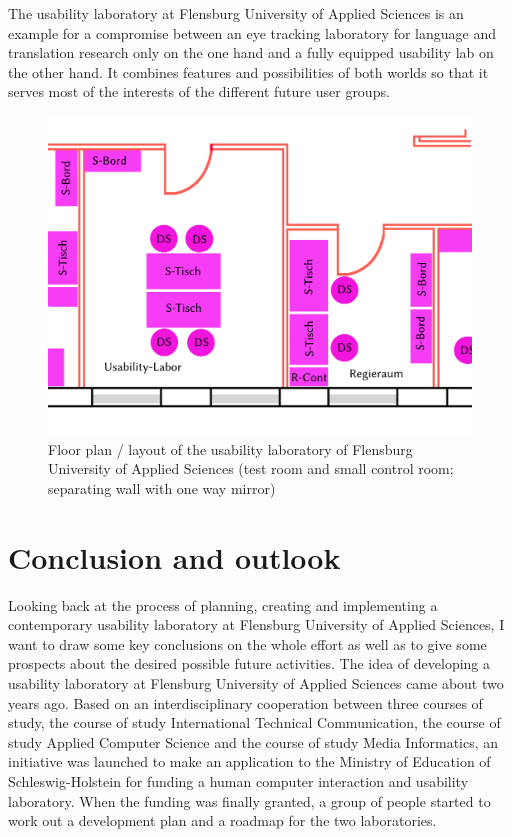 \documentclass[output=paper]{langsci/langscibook}
\begin{document}
The usability laboratory at Flensburg University of Applied Sciences is an example for a compromise between an eye tracking laboratory for language and translation research only on the one hand and a fully equipped usability lab on the other hand. It combines features and possibilities of both worlds so that it serves most of the interests of the different future user groups. 


\begin{figure}
 \includegraphics[width=.8\textwidth]{figures/roesener7b.pdf} 

 \caption{Floor plan / layout of the usability laboratory of Flensburg University of Applied Sciences (test room and small control room; separating wall with one way mirror)
}
 \label{roesener:fig:7}
\end{figure} 


\section{Conclusion and outlook }


Looking back at the process of planning, creating and implementing a contemporary usability laboratory at Flensburg University of Applied Sciences, I want to draw some key conclusions on the whole effort as well as to give some prospects about the desired possible future activities. The idea of developing a usability laboratory at Flensburg University of Applied Sciences came about two years ago. Based on an interdisciplinary cooperation between three courses of study, the course of study International Technical Communication, the course of study Applied Computer Science and the course of study Media Informatics, an initiative was launched to make an application to the Ministry of Education of Schleswig-Holstein for funding a human computer interaction and usability laboratory. When the funding was finally granted, a group of people started to work out a development plan and a roadmap for the two laboratories.
\end{document}
